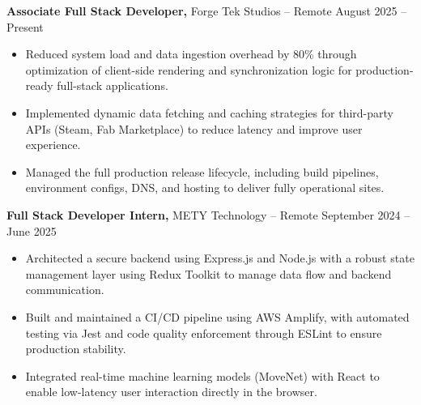 \documentclass[11pt]{article}       %
\begin{document}
\textbf{Associate Full Stack Developer,} {Forge Tek Studios} -- Remote \hfill August 2025 -- Present \\
\vspace{-9pt}
\begin{itemize}
  \item Reduced system load and data ingestion overhead by 80\% through optimization of client-side rendering and synchronization logic for production-ready full-stack applications.
  \item Implemented dynamic data fetching and caching strategies for third-party APIs (Steam, Fab Marketplace) to reduce latency and improve user experience.
  \item Managed the full production release lifecycle, including build pipelines, environment configs, DNS, and hosting to deliver fully operational sites.
\end{itemize}

\textbf{Full Stack Developer Intern,} {METY Technology} -- Remote \hfill September 2024 -- June 2025 \\
\vspace{-9pt}
\begin{itemize}
  \item Architected a secure backend using Express.js and Node.js with a robust state management layer using Redux Toolkit to manage data flow and backend communication.
  \item Built and maintained a CI/CD pipeline using AWS Amplify, with automated testing via Jest and code quality enforcement through ESLint to ensure production stability.
  \item Integrated real-time machine learning models (MoveNet) with React to enable low-latency user interaction directly in the browser.
\end{itemize}

\end{document}

